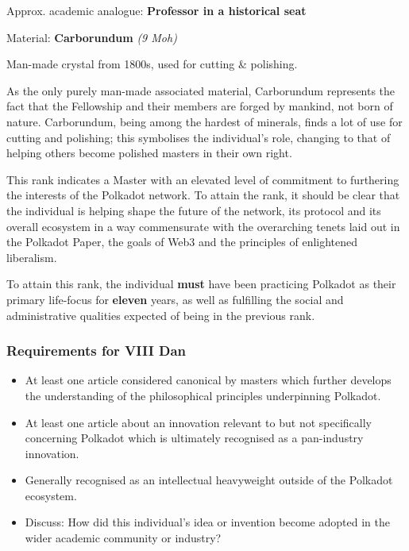 \documentclass[9pt,oneside]{amsart}
\begin{document}

Approx. academic analogue: \textbf{Professor in a historical seat}

Material: \textbf{Carborundum} \emph{(9 Moh)}

Man-made crystal from 1800s, used for cutting \& polishing.

As the only purely man-made associated material, Carborundum represents the fact that the Fellowship and their members are forged by mankind, not born of nature. Carborundum, being among the hardest of minerals, finds a lot of use for cutting and polishing; this symbolises the individual's role, changing to that of helping others become polished masters in their own right.

This rank indicates a Master with an elevated level of commitment to furthering the interests of the Polkadot network. To attain the rank, it should be clear that the individual is helping shape the future of the network, its protocol and its overall ecosystem in a way commensurate with the overarching tenets laid out in the Polkadot Paper, the goals of Web3 and the principles of enlightened liberalism.

To attain this rank, the individual \textbf{must} have been practicing Polkadot as their primary life-focus for \textbf{eleven} years, as well as fulfilling the social and administrative qualities expected of being in the previous rank.

\subsubsection{Requirements for VIII Dan}\label{requirements-8}

\begin{itemize}
\item At least one article considered canonical by masters which further develops the understanding of the philosophical principles underpinning Polkadot.
\item At least one article about an innovation relevant to but not specifically concerning Polkadot which is ultimately recognised as a pan-industry innovation.
\item Generally recognised as an intellectual heavyweight outside of the Polkadot ecosystem.
\item Discuss: How did this individual's idea or invention become adopted in the wider academic community or industry?
\end{itemize}
\end{document}
